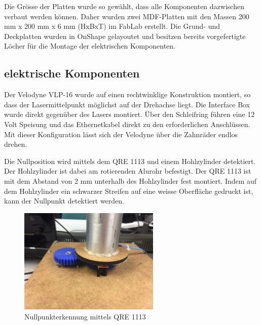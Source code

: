 Die Grösse der Platten wurde so gewählt, dass alle Komponenten dazwischen verbaut werden können. Daher wurden zwei MDF-Platten mit den Massen 200 mm x 200 mm x 6 mm (HxBxT) im FabLab erstellt. Die Grund- und Deckplatten wurden in OnShape gelayoutet und besitzen bereits vorgefertigte Löcher für die Montage der elektrischen Komponenten.

\subsection {elektrische Komponenten}
\label{sec:elekKomp}

Der Velodyne VLP-16 wurde auf einen rechtwinklige Konstruktion montiert, so dass der Lasermittelpunkt möglichst auf der Drehachse liegt. Die Interface Box wurde direkt gegenüber des Lasers montiert. Über den Schleifring führen eine 12 Volt Speisung und das Ethernetkabel direkt zu den erforderlichen Anschlüssen. Mit dieser Konfiguration lässt sich der Velodyne über die Zahnräder endlos drehen.

Die Nullposition wird mittels dem QRE 1113 und einem Hohlzylinder detektiert. Der Hohlzylinder ist dabei am rotierenden Alurohr befestigt. Der QRE 1113 ist mit dem Abstand von 2 mm unterhalb des Hohlzylinder fest montiert. Indem auf dem Hohlzylinder ein schwarzer Streifen auf eine weisse Oberfläche gedruckt ist, kann der Nullpunkt detektiert werden.

\begin{figure}[H]
	\centering
	\includegraphics[angle=180,width=0.6\textwidth]{resources/Nullposition.jpg}
	\caption{Nullpunkterkennung mittels QRE 1113}
	\label{fig:Nullposition}
\end{figure} 

